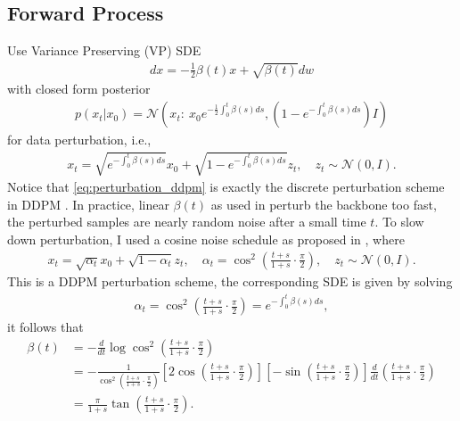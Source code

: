 \documentclass[12pt]{report}
\begin{document}
\subsection{Forward Process}
Use Variance Preserving (VP) SDE \cite{song2020score}
\begin{align}\label{eq:VPSDE}
    dx=-\frac{1}{2}\beta(t)x+\sqrt{\beta(t)}dw
\end{align}
with closed form posterior
\begin{align*}
    p\left(x_t|x_0\right)=\mathcal{N}\left(x_t:\:x_0e^{-\frac{1}{2}\int_0^t\beta(s)ds},\left(1-e^{-\int_0^t\beta(s)ds}\right)I\right)
\end{align*}
for data perturbation, i.e.,
\begin{align}\label{eq:perturbation_ddpm}
    x_t=\sqrt{e^{-\int_0^t\beta(s)ds}}x_0+\sqrt{1-e^{-\int_0^t\beta(s)ds}}z_t,\quad z_t\sim\mathcal{N}\left(0, I\right).
\end{align}
Notice that \cref{eq:perturbation_ddpm} is exactly the discrete perturbation scheme in DDPM \cite{ho2020denoising}. In practice, linear \(\beta(t)\) as used in \cite{song2020score} perturb the backbone too fast, the perturbed samples are nearly random noise after a small time \(t\). To slow down perturbation, I used a cosine noise schedule as proposed in \cite{nicholImprovedDenoisingDiffusion2021}, where
\begin{align*}
    x_t=\sqrt{\alpha_t}x_0+\sqrt{1-\alpha_t}z_t,\quad\alpha_t=\cos^2\left(\frac{t+s}{1+s}\cdot\frac{\pi}{2}\right),\quad z_t\sim\mathcal{N}\left(0, I\right).
\end{align*}
This is a DDPM perturbation scheme, the corresponding SDE is given by solving
\begin{align*}
    \alpha_t=\cos^2\left(\frac{t+s}{1+s}\cdot\frac{\pi}{2}\right)=e^{-\int_0^t\beta(s)ds},
\end{align*}
it follows that
\begin{align*}
    \beta(t)
    &=-\frac{d}{dt}\log\cos^2\left(\frac{t+s}{1+s}\cdot\frac{\pi}{2}\right)\\
    &=-\frac{1}{\cos^2\left(\frac{t+s}{1+s}\cdot\frac{\pi}{2}\right)}\left[2\cos\left(\frac{t+s}{1+s}\cdot\frac{\pi}{2}\right)\right]\left[-\sin\left(\frac{t+s}{1+s}\cdot\frac{\pi}{2}\right)\right]\frac{d}{dt}\left(\frac{t+s}{1+s}\cdot\frac{\pi}{2}\right)\\
    &=\frac{\pi}{1+s}\tan\left(\frac{t+s}{1+s}\cdot\frac{\pi}{2}\right).
\end{align*}
\end{document}
